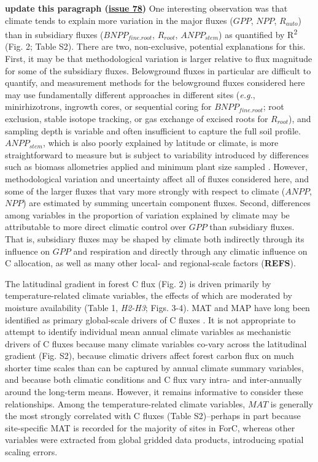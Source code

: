 \documentclass[
]{article}
\begin{document}
{\textbf{update this paragraph
(\href{https://github.com/forc-db/Global_Productivity/issues/78}{issue
78})} One interesting observation was that climate tends to explain more
variation in the major fluxes (\(GPP\), \(NPP\), \(R_{auto}\)) than in
subsidiary fluxes (\(BNPP_{fine.root}\), \(R_{root}\), \(ANPP_{stem}\))
as quantified by R\textsuperscript{2} (Fig. 2; Table S2). There are two,
non-exclusive, potential explanations for this. First, it may be that
methodological variation is larger relative to flux magnitude for some
of the subsidiary fluxes. Belowground fluxes in particular are difficult
to quantify, and measurement methods for the belowground fluxes
considered here may use fundamentally different approaches in different
sites (\emph{e.g.}, minirhizotrons, ingrowth cores, or sequential coring
for \(BNPP_{fine.root}\); root exclusion, stable isotope tracking, or
gas exchange of excised roots for \(R_{root}\)), and sampling depth is
variable and often insufficient to capture the full soil profile.
\(ANPP_{stem}\), which is also poorly explained by latitude or climate,
is more straightforward to measure but is subject to variability
introduced by differences such as biomass allometries applied and
minimum plant size sampled \citep{clark_measuring_2001}. However,
methodological variation and uncertainty affect all of fluxes considered
here, and some of the larger fluxes that vary more strongly with respect
to climate (\(ANPP\), \(NPP\)) are estimated by summing uncertain
component fluxes. Second, differences among variables in the proportion
of variation explained by climate may be attributable to more direct
climatic control over \(GPP\) than subsidiary fluxes. That is,
subsidiary fluxes may be shaped by climate both indirectly through its
influence on \(GPP\) and respiration and directly through any climatic
influence on C allocation, as well as many other local- and
regional-scale factors (\textbf{REFS}).

The latitudinal gradient in forest C flux (Fig. 2) is driven primarily
by temperature-related climate variables, the effects of which are
moderated by moisture availability (Table 1, \emph{H2-H3}; Figs. 3-4).
MAT and MAP have long been identified as primary global-scale drivers of
C fluxes
\citetext{\citealp{lieth_primary_1973}; \citealp[\textbf{REFS};][]{taylor_temperature_2017}}.
It is not appropriate to attempt to identify individual mean annual
climate variables as mechanistic drivers of C fluxes because many
climate variables co-vary across the latitudinal gradient (Fig. S2),
because climatic drivers affect forest carbon flux on much shorter time
scales than can be captured by annual climate summary variables, and
because both climatic conditions and C flux vary intra- and
inter-annually around the long-term means. However, it remains
informative to consider these relationships. Among the
temperature-related climate variables, \(MAT\) is generally the most
strongly correlated with C fluxes (Table S2)--perhaps in part because
site-specific MAT is recorded for the majority of sites in ForC, whereas
other variables were extracted from global gridded data products,
introducing spatial scaling errors.

}
\end{document}
